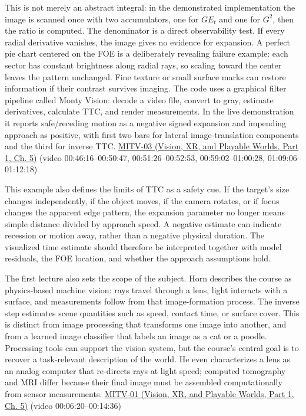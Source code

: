 This is not merely an abstract integral: in the demonstrated implementation the image is scanned once with two accumulators, one for \(GE_t\) and one for \(G^2\), then the ratio is computed. The denominator is a direct observability test. If every radial derivative vanishes, the image gives no evidence for expansion. A perfect pie chart centered on the FOE is a deliberately revealing failure example: each sector has constant brightness along radial rays, so scaling toward the center leaves the pattern unchanged. Fine texture or small surface marks can restore information if their contrast survives imaging. The code uses a graphical filter pipeline called Monty Vision: decode a video file, convert to gray, estimate derivatives, calculate TTC, and render measurements. In the live demonstration it reports safe/receding motion as a negative signed expansion and impending approach as positive, with first two bars for lateral image-translation components and the third for inverse TTC. \href{../07-Vision-XR-and-Playable-Worlds-P01/main.pdf\#nameddest=04-visual-computing-ii-ch036-mitv-03---time-to-contact-focus-of-expansion-direct-motion-vision-methods-noise-gain}{MITV-03 (Vision, XR, and Playable Worlds, Part 1, Ch. 5)} (video 00:46:16--00:50:47, 00:51:26--00:52:53, 00:59:02--01:00:28, 01:09:06--01:12:18)

This example also defines the limits of TTC as a safety cue. If the target's size changes independently, if the object moves, if the camera rotates, or if focus changes the apparent edge pattern, the expansion parameter no longer means simple distance divided by approach speed. A negative estimate can indicate recession or motion away, rather than a negative physical duration. The visualized time estimate should therefore be interpreted together with model residuals, the FOE location, and whether the approach assumptions hold.

The first lecture also sets the scope of the subject. Horn describes the course as physics-based machine vision: rays travel through a lens, light interacts with a surface, and measurements follow from that image-formation process. The inverse step estimates scene quantities such as speed, contact time, or surface cover. This is distinct from image processing that transforms one image into another, and from a learned image classifier that labels an image as a cat or a poodle. Processing tools can support the vision system, but the course's central goal is to recover a task-relevant description of the world. He even characterizes a lens as an analog computer that re-directs rays at light speed; computed tomography and MRI differ because their final image must be assembled computationally from sensor measurements. \href{../07-Vision-XR-and-Playable-Worlds-P01/main.pdf\#nameddest=04-visual-computing-ii-ch036-mitv-01---introduction-to-machine-vision}{MITV-01 (Vision, XR, and Playable Worlds, Part 1, Ch. 5)} (video 00:06:20--00:14:36)

